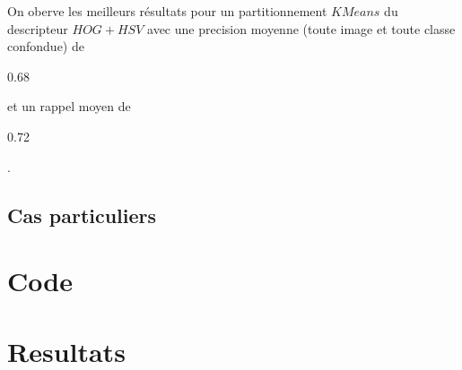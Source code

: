 \documentclass{book}
\begin{document}
\clearpage

On oberve les meilleurs résultats pour un partitionnement $KMeans$ du descripteur $HOG+HSV$ avec une precision moyenne (toute image et toute classe confondue) de 
\begin{bf}0.68\end{bf} et un rappel moyen de \begin{bf}0.72\end{bf}.

\section{Cas particuliers}

\chapter{Code}

\chapter{Resultats}

\clearpage

\appendix
\end{document}
